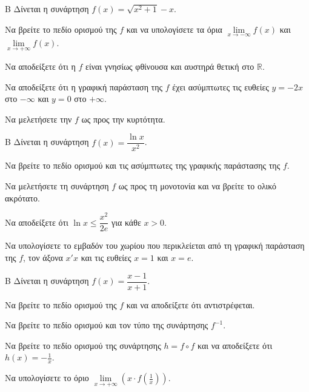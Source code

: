 \begin{thema}{Β}
Δίνεται η συνάρτηση $f(x) = \sqrt{x^2+1} - x$.
\begin{erwthma}
\item Να βρείτε το πεδίο ορισμού της $f$ και να υπολογίσετε τα όρια $\lim\limits_{x \to -\infty} f(x)$ και $\lim\limits_{x \to +\infty} f(x)$.
\item Να αποδείξετε ότι η $f$ είναι γνησίως φθίνουσα και αυστηρά θετική στο $\mathbb{R}$.
\item Να αποδείξετε ότι η γραφική παράσταση της $f$ έχει ασύμπτωτες τις ευθείες $y = -2x$ στο $-\infty$ και $y = 0$ στο $+\infty$.
\item Να μελετήσετε την $f$ ως προς την κυρτότητα.
\end{erwthma}
\end{thema}

\begin{thema}{Β}
Δίνεται η συνάρτηση $f(x) = \dfrac{\ln x}{x^2}$.
\begin{erwthma}
\item Να βρείτε το πεδίο ορισμού και τις ασύμπτωτες της γραφικής παράστασης της $f$.
\item Να μελετήσετε τη συνάρτηση $f$ ως προς τη μονοτονία και να βρείτε το ολικό ακρότατο.
\item Να αποδείξετε ότι $\ln{x} \le \dfrac{x^2}{2e}$ για κάθε $x > 0$.
\item Να υπολογίσετε το εμβαδόν του χωρίου που περικλείεται από τη γραφική παράσταση της $f$, τον άξονα $x'x$ και τις ευθείες $x=1$ και $x=e$.
\end{erwthma}
\end{thema}

\begin{thema}{Β}
Δίνεται η συνάρτηση $f(x) = \dfrac{x-1}{x+1}$.
\begin{erwthma}
\item Να βρείτε το πεδίο ορισμού της $f$ και να αποδείξετε ότι αντιστρέφεται.
\item Να βρείτε το πεδίο ορισμού και τον τύπο της συνάρτησης $f^{-1}$.
\item Να βρείτε το πεδίο ορισμού της συνάρτησης $h = f \circ f$ και να αποδείξετε ότι $h(x) = -\frac{1}{x}$.
\item Να υπολογίσετε το όριο $\lim\limits_{x \to +\infty} \left( x \cdot f\left(\frac{1}{x}\right) \right)$.
\end{erwthma}
\end{thema}

